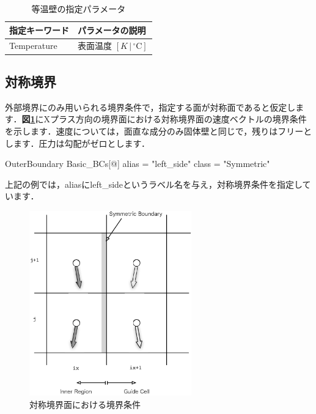 \begin{table}[htdp]
\caption{等温壁の指定パラメータ}
\begin{center}
\small
\begin{tabular}{ll} \toprule
指定キーワード & パラメータの説明\\ \midrule
Temperature & 表面温度 $[K\,|\,{}^\circ\mathrm{C}]$\\
\bottomrule
\end{tabular}
\end{center}
\label{tbl:iso-thermal}
\end{table}


\pagebreak
\subsection{対称境界}

外部境界にのみ用いられる境界条件で，指定する面が対称面であると仮定します．\textbf{図\ref{fig:symmetric plane}}にXプラス方向の境界面における対称境界面の速度ベクトルの境界条件を示します．速度については，面直な成分のみ固体壁と同じで，残りはフリーとします．圧力は勾配がゼロとします．


{\small
\begin{program}
OuterBoundary {
  Basic_BCs[@] {
    alias    = "left_side"
    class    = "Symmetric"
  }
}
\end{program}
}


上記の例では，aliasにleft\_sideというラベル名を与え，対称境界条件を指定しています．

\begin{figure}[htbp]
\begin{center}
\includegraphics[width=7cm,clip]{symmetric.eps}
\end{center}
\caption{対称境界面における境界条件}
\label{fig:symmetric plane}
\end{figure}

